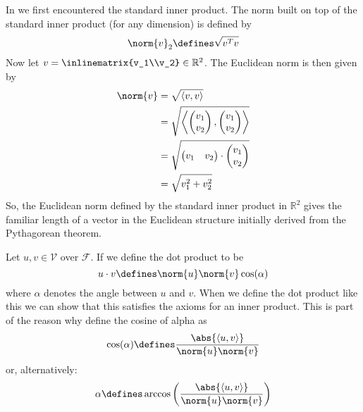 \begin{exm}\label{exm-norm:1}
	In  we first encountered the standard inner
	product. The norm built on top of the standard inner product (for any dimension)
	is defined by
	\begin{equation}
		\norm{v}_2\defines\sqrt{v^Tv}
	\end{equation}
	Now let $v=\inlinematrix{v_1\\v_2}\in\mathbb{R}^2$.
	The Euclidean norm is then given by
	\begin{align*}
		\norm{v} & = \sqrt{\left<v,v\right>}                                                  \\
		         & = \sqrt{\left<\begin{pmatrix}v_1\\v_2\end{pmatrix},\begin{pmatrix}v_1\\v_2\end{pmatrix}\right>} \\
		         & = \sqrt{\begin{pmatrix}v_1&v_2\end{pmatrix}\cdot\begin{pmatrix}v_1\\v_2\end{pmatrix}}         \\
		         & = \sqrt{v_1^2+v_2^2}
	\end{align*}
	So, the Euclidean norm defined by the standard inner product in $\mathbb{R}^2$
	gives the familiar length of a vector in the Euclidean structure initially
	derived from the Pythagorean theorem.
\end{exm}

\begin{definition}\label{def-dot-product}
	Let $u,v\in\mathcal{V}$ over $\mathcal{F}$. If we define the dot product to be
	\begin{equation}\label{eq-dot-product}
		u \cdot v \defines \norm{u}\norm{v}\cos(\alpha)
	\end{equation}
	where $\alpha$ denotes the angle between $u$ and $v$. When we define the dot
	product like this we can show that this satisfies the axioms for an inner product.
	This is part of the reason why define the cosine of alpha as
	\begin{equation}\label{eq-cos-of-vectors}
		\cos(\alpha)\defines\frac{\abs{\left<u,v\right>}}{\norm{u}\norm{v}}
	\end{equation}
	or, alternatively:
	\begin{equation}\label{eq-angle-of-vectors}
		\alpha\defines\arccos\left(\frac{\abs{\left<u,v\right>}}{\norm{u}\norm{v}}\right)
	\end{equation}
\end{definition}


